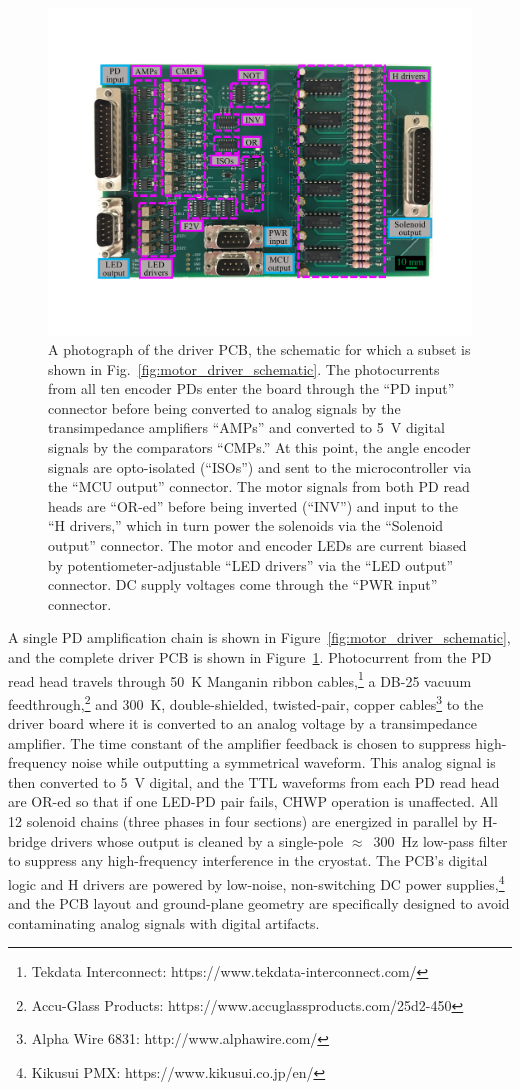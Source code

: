 \begin{figure}[!t]
    \centering
    \includegraphics[width=0.7\linewidth, trim=3.0cm 3.5cm 2.5cm 3.6cm, clip]{CHWPDesign/Figures/motorDriver_photo.pdf}
    \caption{A photograph of the driver PCB, the schematic for which a subset is shown in Fig.~\ref{fig:motor_driver_schematic}. The photocurrents from all ten encoder PDs enter the board through the ``PD input'' connector before being converted to analog signals by the transimpedance amplifiers ``AMPs'' and converted to 5~V digital signals by the comparators ``CMPs.'' At this point, the angle encoder signals are opto-isolated (``ISOs'') and sent to the microcontroller via the ``MCU output'' connector. The motor signals from both PD read heads are ``OR-ed'' before being inverted (``INV'') and input to the ``H drivers,'' which in turn power the solenoids via the ``Solenoid output'' connector. The motor and encoder LEDs are current biased by potentiometer-adjustable ``LED drivers'' via the ``LED output'' connector. DC supply voltages come through the ``PWR input'' connector.}
    \label{fig:motor_driver_photo}
\end{figure}

A single PD amplification chain is shown in Figure~\ref{fig:motor_driver_schematic}, and the complete driver PCB is shown in Figure~\ref{fig:motor_driver_photo}. Photocurrent from the PD read head travels through 50~K Manganin ribbon cables,\footnote{Tekdata Interconnect: https://www.tekdata-interconnect.com/} a DB-25 vacuum feedthrough,\footnote{Accu-Glass Products: https://www.accuglassproducts.com/25d2-450} and 300~K, double-shielded, twisted-pair, copper cables\footnote{Alpha Wire 6831: http://www.alphawire.com/} to the driver board where it is converted to an analog voltage by a transimpedance amplifier. The time constant of the amplifier feedback is chosen to suppress high-frequency noise while outputting a symmetrical waveform. This analog signal is then converted to 5~V digital, and the TTL waveforms from each PD read head are OR-ed so that if one LED-PD pair fails, CHWP operation is unaffected. All 12 solenoid chains (three phases in four sections) are energized in parallel by H-bridge drivers whose output is cleaned by a single-pole $\approx$~300~Hz low-pass filter to suppress any high-frequency interference in the cryostat. The PCB's digital logic and H drivers are powered by low-noise, non-switching DC power supplies,\footnote{Kikusui PMX: https://www.kikusui.co.jp/en/} and the PCB layout and ground-plane geometry are specifically designed to avoid contaminating analog signals with digital artifacts.

